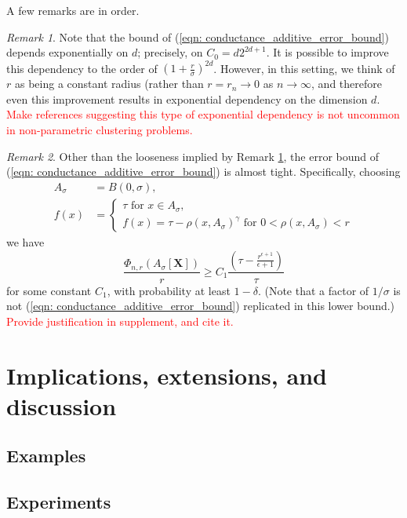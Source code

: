 \documentclass{article}
\newcommand{\Asig}{A_{\sigma}}
\newcommand{\1}{\mathbf{1}}
\theoremstyle{aldenthm}
\theoremstyle{remark}
\newtheorem{remark}{Remark}
\begin{document}
A few remarks are in order. 
\begin{remark}
	\label{rem: exp_in_d}
	Note that the bound of (\ref{eqn: conductance_additive_error_bound}) depends exponentially on $d$; precisely, on $C_0 = d2^{2d +1}$. It is possible to improve this dependency to the order of $(1 + \frac{r}{\sigma})^{2d}$. However, in this setting, we think of $r$ as being a constant radius (rather than $r = r_n \to 0$ as $n \to \infty$, and therefore even this improvement results in exponential dependency on the dimension $d$. \textcolor{red}{Make references suggesting this type of exponential dependency is not uncommon in non-parametric clustering problems.}
\end{remark}
\begin{remark}
	Other than the looseness implied by Remark \ref{rem: exp_in_d}, the error bound of (\ref{eqn: conductance_additive_error_bound}) is almost tight. Specifically, choosing
	\begin{align*}
	\Asig & = B(0,\sigma), \\
	 f(x) & = 
	 \begin{cases}
	 \tau \text{ for $x \in \Asig$}, \\
	  f(x) = \tau - \rho(x,\Asig)^{\gamma} \text{ for $0 < \rho(x,\Asig) < r$}
	 \end{cases}
	\end{align*}
	we have
	\begin{equation}
	\frac{\Phi_{n,r}(\Asig[\mathbf{X}])}{r} \geq C_1 \frac{(\tau - \frac{r^{\epsilon+1}}{\epsilon+1})}{\tau}
	\end{equation}
	for some constant $C_1$, with probability at least $1 - \delta$. (Note that a factor of $1 / \sigma$ is not (\ref{eqn: conductance_additive_error_bound}) replicated in this lower bound.) \textcolor{red}{Provide justification in supplement, and cite it.}
\end{remark}

\section{Implications, extensions, and discussion}
\label{section: everything_else}
\subsection{Examples}
\subsection{Experiments}

\clearpage



\end{document}
